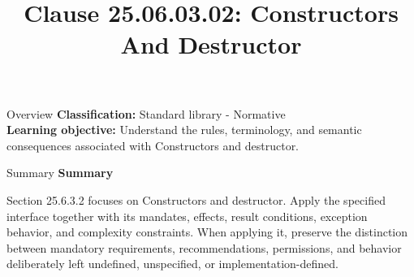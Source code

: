 \documentclass[10pt,letterpaper]{article}
\title{Clause 25.06.03.02: Constructors And Destructor}
\author{}
\date{}
\begin{document}
\maketitle
\begin{CornellOverviewBox}{Overview}
\textbf{Classification:} Standard library - Normative\\[2pt]
\textbf{Learning objective:} Understand the rules, terminology, and semantic consequences associated with Constructors and destructor.
\end{CornellOverviewBox}\begin{CornellSummaryBox}{Summary}
{\sffamily\bfseries\color{Accent} Summary}\par\vspace{3pt}Section 25.6.3.2 focuses on Constructors and destructor. Apply the specified interface together with its mandates, effects, result conditions, exception behavior, and complexity constraints. When applying it, preserve the distinction between mandatory requirements, recommendations, permissions, and behavior deliberately left undefined, unspecified, or implementation-defined.
\end{CornellSummaryBox}
\end{document}

